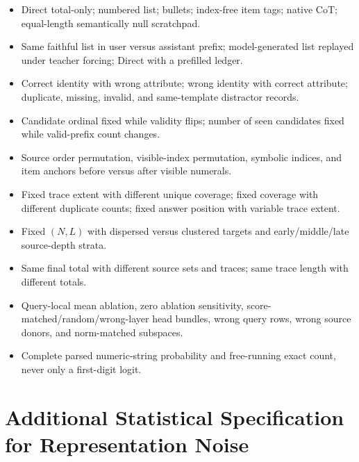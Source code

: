 \begin{itemize}
  \item Direct total-only; numbered list; bullets; index-free item tags; native CoT; equal-length semantically null scratchpad.
  \item Same faithful list in user versus assistant prefix; model-generated list replayed under teacher forcing; Direct with a prefilled ledger.
  \item Correct identity with wrong attribute; wrong identity with correct attribute; duplicate, missing, invalid, and same-template distractor records.
  \item Candidate ordinal fixed while validity flips; number of seen candidates fixed while valid-prefix count changes.
  \item Source order permutation, visible-index permutation, symbolic indices, and item anchors before versus after visible numerals.
  \item Fixed trace extent with different unique coverage; fixed coverage with different duplicate counts; fixed answer position with variable trace extent.
  \item Fixed \((N,L)\) with dispersed versus clustered targets and early/middle/late source-depth strata.
  \item Same final total with different source sets and traces; same trace length with different totals.
  \item Query-local mean ablation, zero ablation sensitivity, score-matched/random/wrong-layer head bundles, wrong query rows, wrong source donors, and norm-matched subspaces.
  \item Complete parsed numeric-string probability and free-running exact count, never only a first-digit logit.
\end{itemize}

\section{Additional Statistical Specification for Representation Noise}
\label{app:noise}

